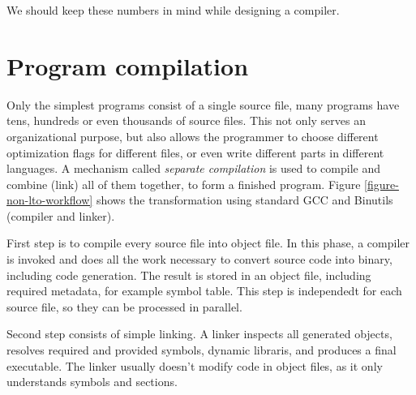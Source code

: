 We should keep these numbers in mind while designing a compiler.

\section{Program compilation}

Only the simplest programs consist of a single source file, many programs have
tens, hundreds or even thousands of source files. This not only serves an
organizational purpose, but also allows the programmer to choose different
optimization flags for different files, or even write different parts in
different languages. A mechanism called {\sl separate compilation} is used to
compile and combine (link) all of them together, to form a finished program.
Figure \ref{figure-non-lto-workflow} shows the transformation using standard GCC
and Binutils (compiler and linker).

First step is to compile every  source file into object file. In this phase, a
compiler is invoked and does all the work necessary to convert source code into
binary, including code generation. The result is stored in an object file,
including required metadata, for example symbol table. This step is independedt
for each source file, so they can be processed in parallel. 

Second step consists of simple linking. A linker inspects all generated objects,
resolves required and provided symbols, dynamic libraris, and produces a
final executable. The linker usually doesn't modify code in object files, as it
only understands symbols and sections.

